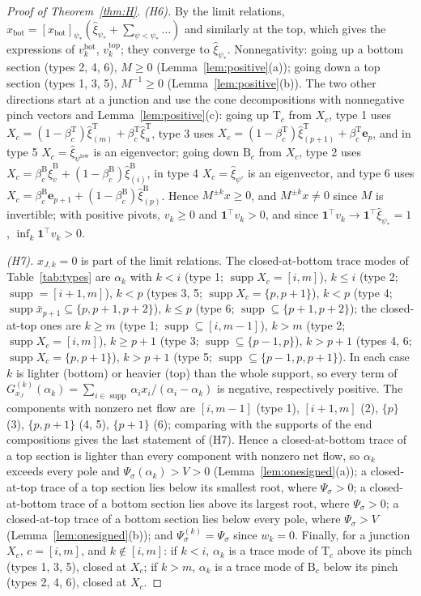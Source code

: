 \documentclass[11pt,a4paper]{report}
\newcommand{\one}{\mathbf 1}
\newcommand{\bfe}{\mathbf e}
\newcommand{\Ts}{\mathrm T}
\newcommand{\Bs}{\mathrm B}
\newcommand{\xb}{x_{\mathrm{bot}}}
\newcommand{\supp}{\operatorname{supp}}
\begin{document}
\begin{proof}[Proof of Theorem~\ref{thm:H}]
\emph{(H6).} By the limit relations, \(\xb=[\xb]_{\psi_*}(\hat\xi_{\psi_*}+\sum_{\psi<\psi_*}\dots)\) and similarly at the top, which gives the
expressions of \(v^{\mathrm{bot}}_k\), \(v^{\mathrm{top}}_k\); they converge to \(\hat\xi_{\psi_*}\). Nonnegativity: going up a bottom section
(types 2, 4, 6), \(M\ge0\) (Lemma~\ref{lem:positive}(a)); going down a top section (types 1, 3, 5), \(M^{-1}\ge0\)
(Lemma~\ref{lem:positive}(b)). The two other directions start at a junction and use the cone decompositions with nonnegative
pinch vectors and Lemma~\ref{lem:positive}(c): going up \(\Ts_c\) from \(X_c\), type 1 uses
\(X_c=(1-\beta^\Ts_c)\hat\xi^\Ts_{(m)}+\beta^\Ts_c\hat\xi^\Ts_u\), type 3 uses \(X_c=(1-\beta^\Ts_c)\hat\xi^\Ts_{(p+1)}+\beta^\Ts_c\bfe_p\), and in type 5
\(X_c=\hat\xi_{\psi^{\mathrm{low}}}\) is an eigenvector; going down \(\Bs_c\) from \(X_c\), type 2 uses
\(X_c=\beta^\Bs_c\hat\xi^\Bs_v+(1-\beta^\Bs_c)\hat\xi^\Bs_{(i)}\), in type 4 \(X_c=\hat\xi_{\psi'}\) is an eigenvector, and type 6 uses
\(X_c=\beta^\Bs_c\bfe_{p+1}+(1-\beta^\Bs_c)\hat\xi^\Bs_{(p)}\). Hence \(M^{\pm k}x\ge0\), and \(M^{\pm k}x\ne0\) since \(M\) is invertible; with
positive pivots, \(v_k\ge0\) and \(\one^\top v_k>0\), and since \(\one^\top v_k\to\one^\top\hat\xi_{\psi_*}=1\), \(\inf_k\one^\top v_k>0\).

\emph{(H7).} \(x_{J,k}=0\) is part of the limit relations. The closed-at-bottom trace modes of Table~\ref{tab:types} are \(\alpha_k\) with
\(k<i\) (type 1; \(\supp X_c=[i,m]\)), \(k\le i\) (type 2; \(\supp=[i+1,m]\)), \(k<p\) (types 3, 5; \(\supp X_c=\{p,p+1\}\)), \(k<p\) (type 4;
\(\supp\bar x_{p+1}\subseteq\{p,p+1,p+2\}\)), \(k\le p\) (type 6; \(\supp\subseteq\{p+1,p+2\}\)); the closed-at-top ones are \(k\ge m\) (type 1;
\(\supp\subseteq[i,m-1]\)), \(k>m\) (type 2; \(\supp X_c=[i,m]\)), \(k\ge p+1\) (type 3; \(\supp\subseteq\{p-1,p\}\)), \(k>p+1\) (types 4, 6;
\(\supp X_c=\{p,p+1\}\)), \(k>p+1\) (type 5; \(\supp\subseteq\{p-1,p,p+1\}\)). In each case \(k\) is lighter (bottom) or heavier (top) than the
whole support, so every term of \(G^{(k)}_{x_J}(\alpha_k)=\sum_{i\in\supp}\alpha_ix_i/(\alpha_i-\alpha_k)\) is negative, respectively positive.
The components with nonzero net flow are \([i,m-1]\) (type 1), \([i+1,m]\) (2), \(\{p\}\) (3), \(\{p,p+1\}\) (4, 5), \(\{p+1\}\) (6); comparing with
the supports of the end compositions gives the last statement of (H7). Hence a closed-at-bottom trace of a top section is
lighter than every component with nonzero net flow, so \(\alpha_k\) exceeds every pole and \(\Psi_\sigma(\alpha_k)>V>0\)
(Lemma~\ref{lem:onesigned}(a)); a closed-at-top trace of a top section lies below its smallest root, where \(\Psi_\sigma>0\); a
closed-at-bottom trace of a bottom section lies above its largest root, where \(\Psi_\sigma>0\); a closed-at-top trace of a bottom
section lies below every pole, where \(\Psi_\sigma>V\) (Lemma~\ref{lem:onesigned}(b)); and \(\Psi^{(k)}_\sigma=\Psi_\sigma\) since \(w_k=0\).
Finally, for a junction \(X_c\), \(c=[i,m]\), and \(k\notin[i,m]\): if \(k<i\), \(\alpha_k\) is a trace mode of \(\Ts_c\) above its pinch (types 1, 3, 5),
closed at \(X_c\); if \(k>m\), \(\alpha_k\) is a trace mode of \(\Bs_c\) below its pinch (types 2, 4, 6), closed at \(X_c\).


\end{proof}
\end{document}
